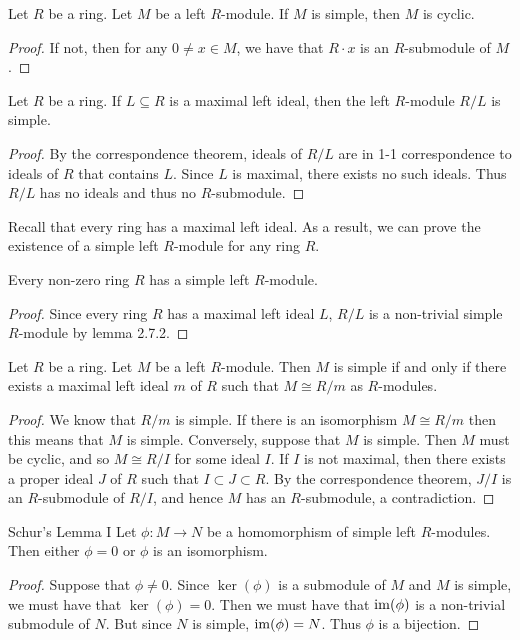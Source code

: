 \documentclass[a4paper]{article}
\begin{document}
\begin{lmm}{}{} Let $R$ be a ring. Let $M$ be a left $R$-module. If $M$ is simple, then $M$ is cyclic. 
\begin{proof}
If not, then for any $0\neq x\in M$, we have that $R\cdot x$ is an $R$-submodule of $M$. 
\end{proof}
\end{lmm}

\begin{lmm}{}{} Let $R$ be a ring. If $L\subseteq R$ is a maximal left ideal, then the left $R$-module $R/L$ is simple. 
\begin{proof}
By the correspondence theorem, ideals of $R/L$ are in 1-1 correspondence to ideals of $R$ that contains $L$. Since $L$ is maximal, there exists no such ideals. Thus $R/L$ has no ideals and thus no $R$-submodule. 
\end{proof}
\end{lmm}

Recall that every ring has a maximal left ideal. As a result, we can prove the existence of a simple left $R$-module for any ring $R$. 

\begin{crl}{}{} Every non-zero ring $R$ has a simple left $R$-module. 
\begin{proof}
Since every ring $R$ has a maximal left ideal $L$, $R/L$ is a non-trivial simple $R$-module by lemma 2.7.2. 
\end{proof}
\end{crl}

\begin{prp}{}{} Let $R$ be a ring. Let $M$ be a left $R$-module. Then $M$ is simple if and only if there exists a maximal left ideal $m$ of $R$ such that $M\cong R/m$ as $R$-modules. 
\begin{proof}
We know that $R/m$ is simple. If there is an isomorphism $M\cong R/m$ then this means that $M$ is simple. Conversely, suppose that $M$ is simple. Then $M$ must be cyclic, and so $M\cong R/I$ for some ideal $I$. If $I$ is not maximal, then there exists a proper ideal $J$ of $R$ such that $I\subset J\subset R$. By the correspondence theorem, $J/I$ is an $R$-submodule of $R/I$, and hence $M$ has an $R$-submodule, a contradiction. 
\end{proof}
\end{prp}

\begin{prp}{Schur's Lemma I}{} Let $\phi:M\to N$ be a homomorphism of simple left $R$-modules. Then either $\phi=0$ or $\phi$ is an isomorphism. 
\begin{proof}
Suppose that $\phi\neq 0$. Since $\ker(\phi)$ is a submodule of $M$ and $M$ is simple, we must have that $\ker(\phi)=0$. Then we must have that $\operatorname{im}(\phi)$ is a non-trivial submodule of $N$. But since $N$ is simple, $\operatorname{im}(\phi)=N$. Thus $\phi$ is a bijection. 
\end{proof}
\end{prp}
\end{document}
